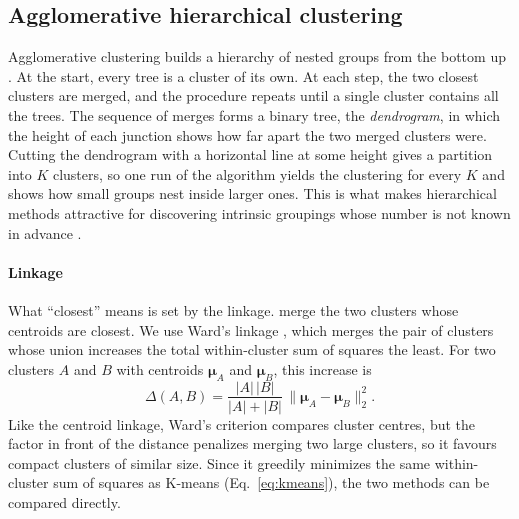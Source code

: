 
\subsection{Agglomerative hierarchical clustering}  %
\label{sec:clust_agglo}                  %

Agglomerative clustering builds a hierarchy of nested groups from the bottom up
\cite{norouzi2024volpam}. At the start, every tree is a cluster of its own. At each step, the two
closest clusters are merged, and the procedure repeats until a single cluster contains all the
trees. The sequence of merges forms a binary tree, the \emph{dendrogram}, in which the height of
each junction shows how far apart the two merged clusters were. Cutting the dendrogram with a
horizontal line at some height gives a partition into $K$ clusters, so one run of the algorithm
yields the clustering for every $K$ and shows how small groups nest inside larger ones. This is
what makes hierarchical methods attractive for discovering intrinsic groupings whose number is
not known in advance \cite{norouzi2024volpam}.

\paragraph{Linkage}                      %
What ``closest'' means is set by the linkage. \citet{norouzi2024volpam} merge the two
clusters whose centroids are closest. We use Ward's linkage \cite{ward1963}, which merges the
pair of clusters whose union increases the total within-cluster sum of squares the least. For
two clusters $A$ and $B$ with centroids $\boldsymbol{\mu}_A$ and $\boldsymbol{\mu}_B$, this
increase is
\begin{equation}
  \Delta(A, B) = \frac{|A|\,|B|}{|A| + |B|}\,
                 \big\|\boldsymbol{\mu}_A - \boldsymbol{\mu}_B\big\|_2^2 .
  \label{eq:ward}                        %
\end{equation}
Like the centroid linkage, Ward's criterion compares cluster centres, but the factor in front of
the distance penalizes merging two large clusters, so it favours compact clusters of similar
size. Since it greedily minimizes the same within-cluster sum of squares as K-means
(Eq.~\eqref{eq:kmeans}), the two methods can be compared directly.

